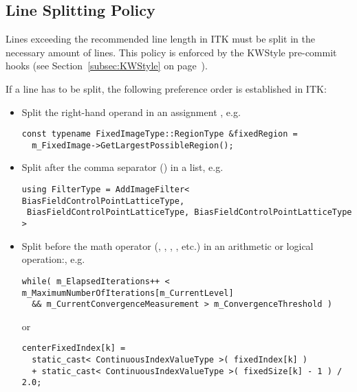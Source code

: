 \subsection{Line Splitting Policy}
\label{subsec:LineSplittingPolicy}

Lines exceeding the recommended line length in ITK must be split in the
necessary amount of lines. This policy is enforced by the KWStyle pre-commit
hooks (see Section~\ref{subsec:KWStyle} on page~\pageref{subsec:KWStyle}).

If a line has to be split, the following preference order is established in ITK:
\begin{itemize}
\item Split the right-hand operand in an assignment \code{=}, e.g.

\small
\begin{verbatim}
const typename FixedImageType::RegionType &fixedRegion =
  m_FixedImage->GetLargestPossibleRegion();
\end{verbatim}
\normalsize

\item Split after the comma separator (\code{,}) in a list, e.g.

\small
\begin{verbatim}
using FilterType = AddImageFilter< BiasFieldControlPointLatticeType,
 BiasFieldControlPointLatticeType, BiasFieldControlPointLatticeType >
\end{verbatim}
\normalsize

\item Split before the math operator (\code{+}, \code{*}, \code{||}, \code{\&\&},
etc.) in an arithmetic or logical operation:, e.g.

\small
\begin{verbatim}
while( m_ElapsedIterations++ < m_MaximumNumberOfIterations[m_CurrentLevel]
  && m_CurrentConvergenceMeasurement > m_ConvergenceThreshold )
\end{verbatim}
\normalsize

or

\small
\begin{verbatim}
centerFixedIndex[k] =
  static_cast< ContinuousIndexValueType >( fixedIndex[k] )
  + static_cast< ContinuousIndexValueType >( fixedSize[k] - 1 ) / 2.0;
\end{verbatim}
\normalsize

\end{itemize}



